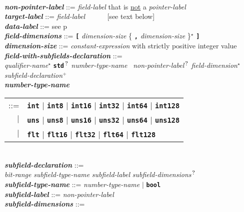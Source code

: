 \documentclass[12pt]{article}
\newcommand{\TT}[1]{{\tt \bfseries #1}}
\newcommand{\STAR}{{\Large $^\star$}}
\newcommand{\PLUS}[1][]{{$^{+#1}$}}
\newcommand{\QMARK}{{$^{\,\mbox{\footnotesize ?}}$}}
\newcommand{\ttkey}[1]{{\tt \bfseries #1}}
\newcommand{\emkey}[1]{{\em \bfseries #1}}
\newcommand{\pagref}[1]{p\pageref{#1}}
\newenvironment{indpar}[1][0.3in]%
	{\begin{list}{}%
		     {\setlength{\itemsep}{0in}%
		      \setlength{\topsep}{0in}%
		      \setlength{\parsep}{1ex}%
		      \setlength{\labelwidth}{#1}%
		      \setlength{\leftmargin}{#1}%
		      \addtolength{\leftmargin}{\labelsep}}%
	 \item}%
	{\end{list}}
\begin{document}
\begin{indpar}
\begin{tabular}[t]{@{}l}
    \end{tabular} \\
\emkey{non-pointer-label}\label{NON-POINTER-LABEL} ::=
    {\em field-label} that is \underline{not} a {\em pointer-label} \\
\emkey{target-label}\label{TARGET-LABEL} ::=  {\em field-label}
    ~~~~~ [see text below] \\
\emkey{data-label} ::=  see \pagref{DATA-LABEL}
\\[2ex]
\emkey{field-dimensions} ::=
    \TT{[} {\em dimension-size} \{ \TT{,} {\em dimension-size} \}\STAR{}
    \TT{]} \\
\emkey{dimension-size} ::=  {\em constant-expression}
			    with strictly positive integer value
\\[2ex]
\emkey{field-with-subfields-declaration} ::= \\
\hspace*{0.5in}
    {\em qualifier-name}\STAR{}
    \TT{std}\QMARK{} {\em number-type-name}~ {\em non-pointer-label}\QMARK{}
                {\em field-dimension}\STAR{} \\
\hspace*{0.5in}
    {\em subfield-declaration}\PLUS{}
\\[2ex]
\emkey{number-type-name}
    \begin{tabular}[t]{@{}rl}
    ::= &  \ttkey{int} $|$ \ttkey{int8} $|$ \ttkey{int16} $|$ \ttkey{int32}
                       $|$ \ttkey{int64} $|$ \ttkey{int128} \\
    $|$ &  \ttkey{uns} $|$ \ttkey{uns8} $|$ \ttkey{uns16} $|$ \ttkey{uns32}
                       $|$ \ttkey{uns64} $|$ \ttkey{uns128} \\
    $|$ &  \ttkey{flt} $|$ \ttkey{flt16} $|$ \ttkey{flt32} $|$ \ttkey{flt64}
                         $|$ \ttkey{flt128} \\
    \end{tabular}
\\[2ex]
\emkey{subfield-declaration}\label{SUBFIELD-DECLARATION} ::= \\
\hspace*{0.5in}
    {\em bit-range} {\em subfield-type-name} {\em subfield-label}
    		{\em subfield-dimensions}\QMARK{} \\
\emkey{subfield-type-name}\label{SUBFIELD-TYPE-NAME} ::=
    {\em number-type-name} $|$ \TT{bool} \\
\emkey{subfield-label}\label{SUBFIELD-LABEL} ::=  {\em non-pointer-label} \\
\emkey{subfield-dimensions} ::=

\end{indpar}
\end{document}
